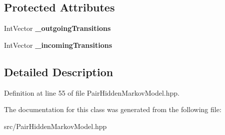 \subsection*{Protected Attributes}
\begin{DoxyCompactItemize}
\item 
\mbox{\label{classtops_1_1PHMMState_a1f03adee3bd0e627010752f8419dd071}} 
Int\+Vector {\bfseries \+\_\+outgoing\+Transitions}
\item 
\mbox{\label{classtops_1_1PHMMState_a63ef55ddeeda44cf108fad3a79f9bf06}} 
Int\+Vector {\bfseries \+\_\+incoming\+Transitions}
\end{DoxyCompactItemize}


\subsection{Detailed Description}


Definition at line 55 of file Pair\+Hidden\+Markov\+Model.\+hpp.



The documentation for this class was generated from the following file\+:\begin{DoxyCompactItemize}
\item 
src/Pair\+Hidden\+Markov\+Model.\+hpp\end{DoxyCompactItemize}

